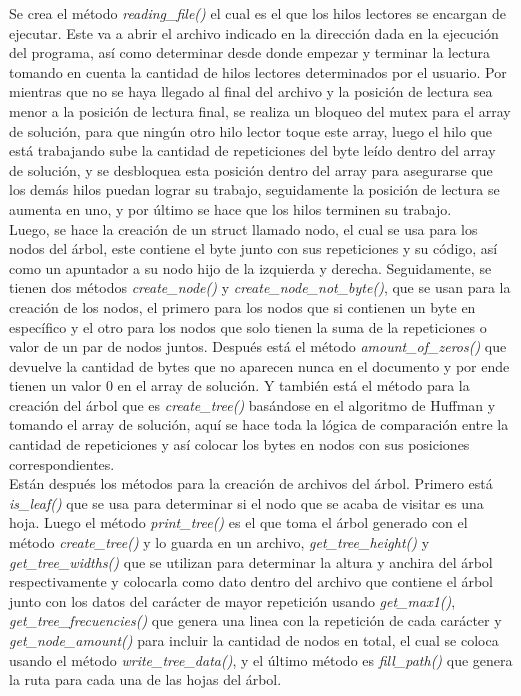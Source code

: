 \documentclass[12pt, article, natbib]{IEEEtran}
\begin{document}
Se crea el método \textit{reading\_file()} el cual es el que los hilos lectores se encargan de ejecutar. Este va a abrir el archivo indicado en la dirección dada en la ejecución del programa, así como determinar desde donde empezar y terminar la lectura tomando en cuenta la cantidad de hilos lectores determinados por el usuario.\cite{chanilastnam_2015_c} \cite{cppreferencecom_2021_fread} \cite{kerrisk_2010_fseek3} Por mientras que no se haya llegado al final del archivo y la posición de lectura sea menor a la posición de lectura final, se realiza un bloqueo del mutex para el array de solución, para que ningún otro hilo lector toque este array, luego el hilo que está trabajando sube la cantidad de repeticiones del byte leído dentro del array de solución, y se desbloquea esta posición dentro del array para asegurarse que los demás hilos puedan lograr su trabajo, seguidamente la posición de lectura se aumenta en uno, y por último se hace que los hilos terminen su trabajo.\cite{kerrisk_2010_pthread_exit3} \\

Luego, se hace la creación de un struct llamado nodo, el cual se usa para los nodos del árbol, este contiene el byte junto con sus repeticiones y su código, así como un apuntador a su nodo hijo de la izquierda y derecha. Seguidamente, se tienen dos métodos \textit{create\_node()} y \textit{create\_node\_not\_byte()}, que se usan para la creación de los nodos, el primero para los nodos que si contienen un byte en específico y el otro para los nodos que solo tienen la suma de la repeticiones o valor de un par de nodos juntos. Después está el método \textit{amount\_of\_zeros()} que devuelve la cantidad de bytes que no aparecen nunca en el documento y por ende tienen un valor 0 en el array de solución. Y también está el método para la creación del árbol que es \textit{create\_tree()} basándose en el algoritmo de Huffman y tomando el array de solución, aquí se hace toda la lógica de comparación entre la cantidad de repeticiones y así colocar los bytes en nodos con sus posiciones correspondientes.\\ 

Están después los métodos para la creación de archivos del árbol. Primero está \textit{is\_leaf()} que se usa para determinar si el nodo que se acaba de visitar es una hoja. Luego el método \textit{print\_tree()} es el que toma el árbol generado con el método \textit{create\_tree()} y lo guarda en un archivo, \textit{get\_tree\_height()} y \textit{get\_tree\_widths()} que se utilizan para determinar la altura y anchira del árbol respectivamente y colocarla como dato dentro del archivo que contiene el árbol junto con los datos del carácter de mayor repetición usando \textit{get\_max1()}, \textit{get\_tree\_frecuencies()} que genera una linea con la repetición de cada carácter y \textit{get\_node\_amount()} para incluir la cantidad de nodos en total, el cual se coloca usando el método \textit{write\_tree\_data()}, y el último método es \textit{fill\_path()} que genera la ruta para cada una de las hojas del árbol.\cite{tutorialspointindiaprivatelimited_c}\cite{sonofblip_2013_append}\cite{dtech_2012_how}\\
\end{document}
